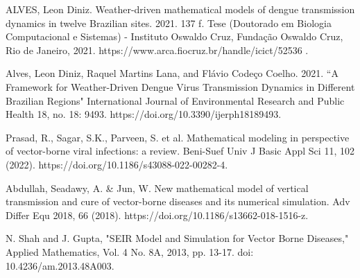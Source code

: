 \documentclass[12pt]{article}
\begin{document}
\noindent [5] ALVES, Leon Diniz. Weather-driven mathematical models of dengue transmission dynamics in twelve Brazilian sites. 2021. 137 f. Tese (Doutorado em Biologia Computacional e Sistemas) - Instituto Oswaldo Cruz, Fundação Oswaldo Cruz, Rio de Janeiro, 2021. https://www.arca.fiocruz.br/handle/icict/52536	.

\noindent [6] Alves, Leon Diniz, Raquel Martins Lana, and Flávio Codeço Coelho. 2021. ``A Framework for Weather-Driven Dengue Virus Transmission Dynamics in Different Brazilian Regions" International Journal of Environmental Research and Public Health 18, no. 18: 9493. https://doi.org/10.3390/ijerph18189493.

\noindent [7] Prasad, R., Sagar, S.K., Parveen, S. et al. Mathematical modeling in perspective of vector-borne viral infections: a review. Beni-Suef Univ J Basic Appl Sci 11, 102 (2022). https://doi.org/10.1186/s43088-022-00282-4.

\noindent [8] Abdullah, Seadawy, A. & Jun, W. New mathematical model of vertical transmission and cure of vector-borne diseases and its numerical simulation. Adv Differ Equ 2018, 66 (2018). 
https://doi.org/10.1186/s13662-018-1516-z.

\noindent [9] N. Shah and J. Gupta, "SEIR Model and Simulation for Vector Borne Diseases," Applied Mathematics, Vol. 4 No. 8A, 2013, pp. 13-17. doi: 10.4236/am.2013.48A003.
\end{document}
